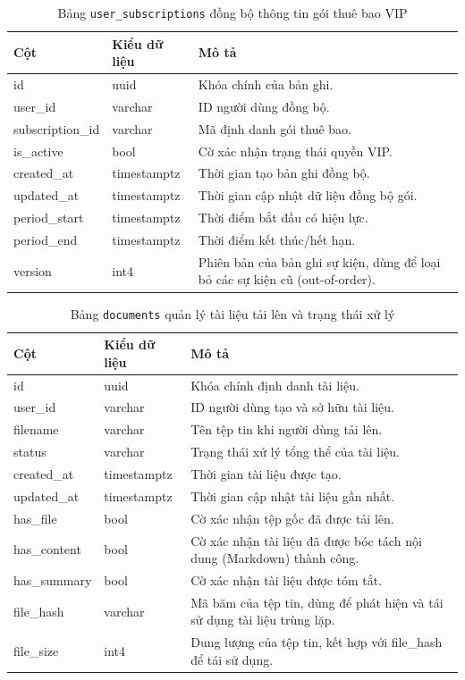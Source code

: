 \begin{table}[H]
\centering
\begin{tabular}{|l|l|p{6cm}|}
\hline
\textbf{Cột} & \textbf{Kiểu dữ liệu} & \textbf{Mô tả} \\ \hline
id & uuid & Khóa chính của bản ghi. \\ \hline
user\_id & varchar & ID người dùng đồng bộ. \\ \hline
subscription\_id & varchar & Mã định danh gói thuê bao. \\ \hline
is\_active & bool & Cờ xác nhận trạng thái quyền VIP. \\ \hline
created\_at & timestamptz & Thời gian tạo bản ghi đồng bộ. \\ \hline
updated\_at & timestamptz & Thời gian cập nhật dữ liệu đồng bộ gói. \\ \hline
period\_start & timestamptz & Thời điểm bắt đầu có hiệu lực. \\ \hline
period\_end & timestamptz & Thời điểm kết thúc/hết hạn. \\ \hline
version & int4 & Phiên bản của bản ghi sự kiện, dùng để loại bỏ các sự kiện cũ (out-of-order). \\ \hline
\end{tabular}
\caption{Bảng \texttt{user\_subscriptions} đồng bộ thông tin gói thuê bao VIP}
\end{table}

\begin{table}[H]
\centering
\begin{tabular}{|l|l|p{6cm}|}
\hline
\textbf{Cột} & \textbf{Kiểu dữ liệu} & \textbf{Mô tả} \\ \hline
id & uuid & Khóa chính định danh tài liệu. \\ \hline
user\_id & varchar & ID người dùng tạo và sở hữu tài liệu. \\ \hline
filename & varchar & Tên tệp tin khi người dùng tải lên. \\ \hline
status & varchar & Trạng thái xử lý tổng thể của tài liệu. \\ \hline
created\_at & timestamptz & Thời gian tài liệu được tạo. \\ \hline
updated\_at & timestamptz & Thời gian cập nhật tài liệu gần nhất. \\ \hline
has\_file & bool & Cờ xác nhận tệp gốc đã được tải lên. \\ \hline
has\_content & bool & Cờ xác nhận tài liệu đã được bóc tách nội dung (Markdown) thành công. \\ \hline
has\_summary & bool & Cờ xác nhận tài liệu được tóm tắt. \\ \hline
file\_hash & varchar & Mã băm của tệp tin, dùng để phát hiện và tái sử dụng tài liệu trùng lặp. \\ \hline
file\_size & int4 & Dung lượng của tệp tin, kết hợp với file\_hash để tái sử dụng. \\ \hline
\end{tabular}
\caption{Bảng \texttt{documents} quản lý tài liệu tải lên và trạng thái xử lý}
\end{table}
